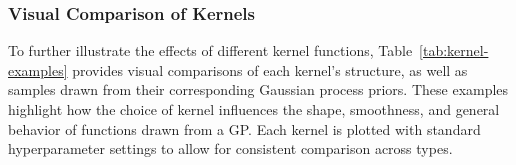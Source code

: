 \documentclass{article}
\begin{document}
\subsubsection*{Visual Comparison of Kernels}

To further illustrate the effects of different kernel functions, Table~\ref{tab:kernel-examples} provides visual comparisons of each kernel's structure, as well as samples drawn from their corresponding Gaussian process priors. These examples highlight how the choice of kernel influences the shape, smoothness, and general behavior of functions drawn from a GP. Each kernel is plotted with standard hyperparameter settings to allow for consistent comparison across types.


\begin{table}[H]
    \centering
    \renewcommand{\arraystretch}{4} %
    \setlength{\tabcolsep}{2pt} %
    \small %


\end{table}
\end{document}
